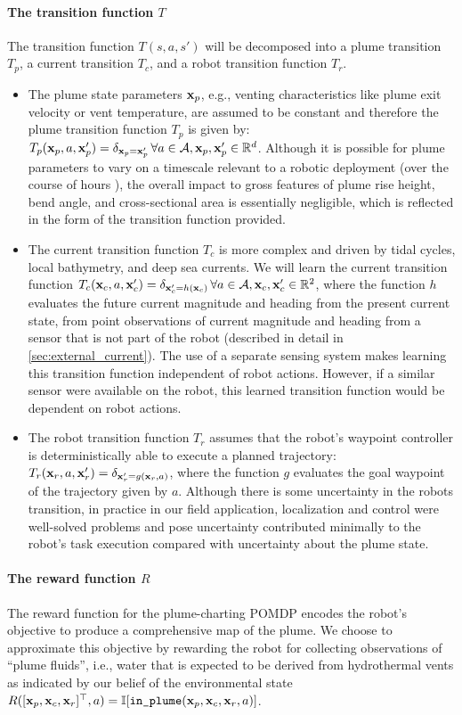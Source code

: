 \paragraph{The transition function $T$} The transition function $T(s, a, s')$ will be decomposed into a plume transition $T_p$, a current transition $T_c$, and a robot transition function $T_r$.
\begin{itemize}
	\item The plume state parameters $\mathbf{x}_p$, e.g., venting characteristics like plume exit velocity or vent temperature, are assumed to be constant and therefore the plume transition function $T_p$ is given by: $T_p(\mathbf{x}_p, a, \mathbf{x}_p') = \delta_{\mathbf{x}_p = \mathbf{x}_p'} \, \forall a \in \mathcal{A}, \mathbf{x}_p, \mathbf{x}_p' \in \mathbb{R}^d$. Although it is possible for plume parameters to vary on a timescale relevant to a robotic deployment (over the course of hours \cite{chevaldonne1991time}), the overall impact to gross features of plume rise height, bend angle, and cross-sectional area is essentially negligible, which is reflected in the form of the transition function provided.
	\item The current transition function $T_c$ is more complex and driven by tidal cycles, local bathymetry, and deep sea currents. We will learn the current transition function $T_c(\mathbf{x}_c, a, \mathbf{x}_c') = \delta_{\mathbf{x}_c' = h(\mathbf{x}_c)} \, \forall a \in \mathcal{A}, \mathbf{x}_c, \mathbf{x}_c' \in \mathbb{R}^2$, where the function $h$ evaluates the future current magnitude and heading from the present current state, from point observations of current magnitude and heading from a sensor that is not part of the robot (described in detail in \cref{sec:external_current}). The use of a separate sensing system makes learning this transition function independent of robot actions. However, if a similar sensor were available on the robot, this learned transition function would be dependent on robot actions.
	\item The robot transition function $T_r$ assumes that the robot's waypoint controller is deterministically able to execute a planned trajectory: $T_r(\mathbf{x}_r, a, \mathbf{x}_r') = \delta_{\mathbf{x}_r' = g(\mathbf{x}_r, a)}$, where the function $g$ evaluates the goal waypoint of the trajectory given by $a$. Although there is some uncertainty in the robots transition, in practice in our field application, localization and control were well-solved problems and pose uncertainty contributed minimally to the robot's task execution compared with uncertainty about the plume state.
\end{itemize}


\paragraph{The reward function $R$} The reward function for the plume-charting POMDP encodes the robot's objective to produce a comprehensive map of the plume. We choose to approximate this objective by rewarding the robot for collecting observations of ``plume fluids'', i.e., water that is expected to be derived from hydrothermal vents as indicated by our belief of the environmental state $R([\x_p, \x_c, \x_r]^\top, a) = \indic{\texttt{in\_plume}(\x_p, \x_c, \x_r, a)}$. 

